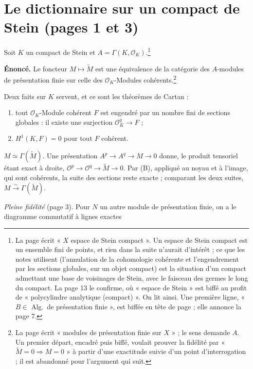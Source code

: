 \documentclass[11pt,a4paper]{article}
\begin{document}
\section*{Le dictionnaire sur un compact de Stein (pages 1 et 3)}

Soit $K$ un compact de Stein et $A = \Gamma(K, \mathcal{O}_{K})$.\footnote{La
page écrit « $X$ espace de Stein compact ». Un espace de Stein compact est
un ensemble fini de points, et rien dans la suite n'aurait d'intérêt ; ce que
les notes utilisent (l'annulation de la cohomologie cohérente et
l'engendrement par les sections globales, sur un objet compact) est la
situation d'un compact admettant une base de voisinages de Stein, avec le
faisceau des germes le long du compact. La page 13 le confirme,
où « espace de Stein » est biffé au profit de « polycylindre analytique
(compact) ». On lit ainsi. Une première ligne, « $B \in$ Alg.\ de présentation
finie », est biffée en tête de page ; elle annonce la page 7.}

\textbf{Énoncé.} Le foncteur $M \mapsto \widetilde{M}$ est une équivalence de
la catégorie des $A$-modules de présentation finie sur celle des
$\mathcal{O}_{K}$-Modules cohérents.\footnote{La page écrit « modules de
présentation finie sur $X$ » ; le sens demande $A$. Un premier départ,
encadré puis biffé, voulait prouver la fidélité par
« $\widetilde{M} = 0 \Rightarrow M = 0$ » à partir d'une exactitude suivie
d'un point d'interrogation ; il est abandonné pour l'argument qui suit.}

Deux faits sur $K$ servent, et ce sont les théorèmes de Cartan :
\begin{enumerate}
\item[(A)] tout $\mathcal{O}_{K}$-Module cohérent $F$ est engendré par un
nombre fini de sections globales : il existe une surjection
$\mathcal{O}_{K}^{q} \to F$ ;
\item[(B)] $H^{1}(K, F) = 0$ pour tout $F$ cohérent.
\end{enumerate}

\emph{$M \simeq \Gamma(\widetilde{M})$.} Une présentation
$A^{p} \to A^{q} \to M \to 0$ donne, le produit tensoriel étant exact à
droite, $\mathcal{O}^{p} \to \mathcal{O}^{q} \to \widetilde{M} \to 0$. Par
(B), appliqué au noyau et à l'image, qui sont cohérents, la suite des sections
reste exacte ; comparant les deux suites, $M \xrightarrow{\sim}
\Gamma(\widetilde{M})$.

\emph{Pleine fidélité} (page 3). Pour $N$ un autre module de présentation
finie, on a le diagramme commutatif à lignes exactes
\end{document}
